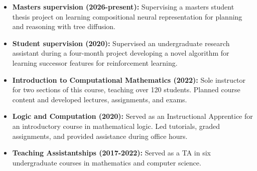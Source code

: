 \documentclass[11pt,a4paper,ragged2e,academicons]{altacv}
\begin{document}
\begin{fullwidth}

\begin{itemize}
\item \textbf{Masters supervision (2026-present):} 
Supervising a masters student thesis project on learning compositional neural representation for planning and reasoning with tree diffusion. 
\item \textbf{Student supervision (2020):} Supervised an undergraduate research assistant during a four-month project developing a novel algorithm for learning successor features for reinforcement learning.
\item \textbf{Introduction to Computational Mathematics (2022):} Sole instructor for two sections of this course, teaching over 120 students. Planned course content and developed lectures, assignments, and exams. %
    \item \textbf{Logic and Computation (2020):} Served as an Instructional Apprentice for an introductory course in mathematical logic. Led tutorials, graded assignments, and provided assistance during office hours.
    \item \textbf{Teaching Assistantships (2017-2022):} Served as a TA in six undergraduate courses in mathematics and computer science.
\end{itemize}


 



\end{fullwidth}
\end{document}

